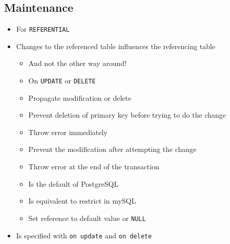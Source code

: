 \subsection{Maintenance}
\begin{itemize}
    \item For \verb+REFERENTIAL+
    \item Changes to the referenced table influences the referencing table
        \begin{itemize}
            \item And not the other way around!
            \item On \verb+UPDATE+ or \verb+DELETE+
        \end{itemize}
        \begin{itemize}
            \item Propagate modification or delete
        \end{itemize}
        \begin{itemize}
            \item Prevent deletion of primary key before trying to do the change
            \item Throw error immediately
        \end{itemize}
        \begin{itemize}
            \item Prevent the modification after attempting the change
            \item Throw error at the end of the transaction
            \item Is the default of PostgreSQL
            \item Is equivalent to restrict in mySQL
        \end{itemize}
        \begin{itemize}
            \item Set reference to default value or \verb+NULL+
        \end{itemize}
    \item Is specified with \verb+on update+ and \verb+on delete+
\end{itemize}
